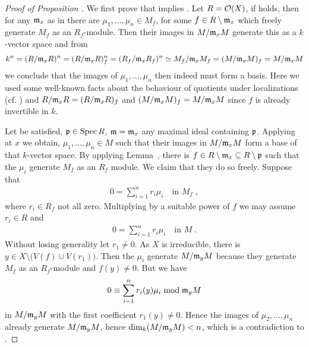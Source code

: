 \documentclass[a4paper,parskip=half,numbers=enddot, DIV=12, headheight=30pt]{scrreprt}
\begin{document}
\begin{proof}[Proof of Proposition ]
    We first prove that  implies . Let $R=\mathcal{O}(X)$, if  holds, then for any $\mathfrak{m}_x$ as in  there are $\mu_1,\ldots,\mu_n\in M_f$, for some $f\in R\setminus \mathfrak{m}_x$ which freely generate $M_f$ as an $R_f$-module. Then their images in $M/\mathfrak{m}_x M$ generate this as a $k$-vector space and from 
    \begin{align*}
    	k^n=(R/\mathfrak{m}_xR)^n=(R/\mathfrak{m}_xR)_f^n=(R_f/\mathfrak{m}_xR_f)^n\simeq M_f/\mathfrak{m}_xM_f=(M/\mathfrak{m}_xM)_f=M/\mathfrak{m}_xM
    \end{align*}
    we conclude that the images of $\mu_1,\ldots,\mu_n$ then indeed must form a basis. Here we used some well-known facts about the behaviour of quotients under localizations (cf. \cite[Proposition~2.3.2]{alg1}) and $R/\mathfrak{m}_xR=(R/\mathfrak{m}_xR)_f$ and $(M/\mathfrak{m}_xM)_f=M/\mathfrak{m}_xM$ since $f$ is already invertible in $k$.
    
    Let  be satisfied, $\mathfrak{p}\in \operatorname{Spec} R$, $\mathfrak{m} = \mathfrak{m}_x$ any maximal ideal containing $\mathfrak{p}$. Applying  at $x$ we obtain, $\mu_1,\ldots,\mu_n\in M$ such that their images in $M/\mathfrak{m}_x M$ form a base of that $k$-vector space. By applying Lemma~, there is $f\in R\setminus\mathfrak{m}_x\subseteq R\setminus \mathfrak{p}$ such that the $\mu_i$ generate $M_f$ as an $R_f$ module. We claim that they do so freely. Suppose that 
    \begin{align*}
    	0 = \sum_{i=1}^nr_i \mu_i\quad\text{in }M_f\;,
    \end{align*}
    where $r_i\in R_f$ not all zero. Multiplying by a suitable power of $f$ we may assume $r_i\in R$ and 
    \begin{align*}
    	 0=\sum_{i=1}^n r_i \mu_i \quad\text{in }M\;.
    \end{align*}
   Without losing generality let $r_1 \neq 0$. As $X$ is irreducible, there is $y\in X\setminus\big(V(f)\cup V(r_1)\big)$. Then the $\mu_i$ generate $M/\mathfrak{m}_y M$ because they generate $M_f$ as an $R_f$-module and $f(y)\neq 0$. But we have
    \begin{align*}
        0 \equiv\sum_{i=1}^n r_i(y) \mu_i \bmod \mathfrak{m}_y M
    \end{align*}
    in $M/\mathfrak{m}_y M$ with the first coefficient $r_1(y) \neq 0$. Hence the images of $\mu_2,\ldots,\mu_n$ already generate $M/\mathfrak{m}_y M$, hence $\dim_k(M/\mathfrak{m}_y M) <n$, which is a contradiction to .
\end{proof}
\end{document}
